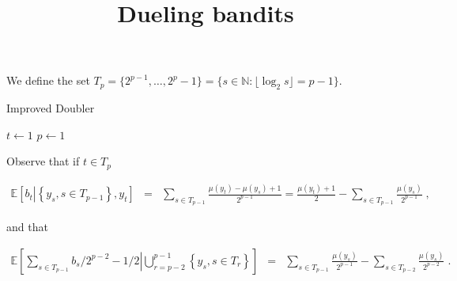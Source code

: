 \documentclass{article}
\numberwithin{equation}{section}
\theoremstyle{plain}
\theoremstyle{plain}
\theoremstyle{plain}
\theoremstyle{remark}
\theoremstyle{remark}
\newcommand{\1}{\ensuremath{\mathbbm{1}}}
\newcommand{\N}{\mathbb{N}}
\newcommand{\E}{\mathbb{E}}
\newcommand{\Dfrac}[2]{{\displaystyle \frac{#1}{#2}}}
\begin{document}
\sloppy

\title{Dueling bandits}



\maketitle

We define the set $T_{p}=\{2^{p-1},\ldots,2^{p}-1\}=\{s\in\N: \lfloor\log_{2}s\rfloor=p-1\}$. 
\vspace{0.3cm}

\begin{algorithm}[H] 
\caption{Improved Doubler}
$t\gets 1$\;
$p\gets 1$\;
\end{algorithm}
\vspace{0.3cm}

Observe that if $t\in T_{p}$

\begin{eqnarray*}
\E\left[b_{t}\left|\left\{y_{s},s\in T_{p-1}\right\}, y_{t}\right.\right] &=& \sum_{s\in T_{p-1}}\Dfrac{\mu\left(y_{t}\right)-\mu\left(y_{s}\right)+1}{2^{p-1}} = \Dfrac{\mu\left(y_{t}\right)+1}{2}-\sum_{s\in T_{p-1}}\Dfrac{\mu\left(y_{s}\right)}{2^{p-1}}\;,
\end{eqnarray*}

and that

\begin{eqnarray*}
\E\left[\sum_{s\in T_{p-1}}b_{s}/2^{p-2}-1/2\left|\bigcup_{r=p-2}^{p-1}\left\{y_{s},s\in T_{r}\right\}\right.\right] &=& \sum_{s\in T_{p-1}}\Dfrac{\mu\left(y_{s}\right)}{2^{p-1}}-\sum_{s\in T_{p-2}}\Dfrac{\mu\left(y_{s}\right)}{2^{p-2}}\;.
\end{eqnarray*}
\end{document}
